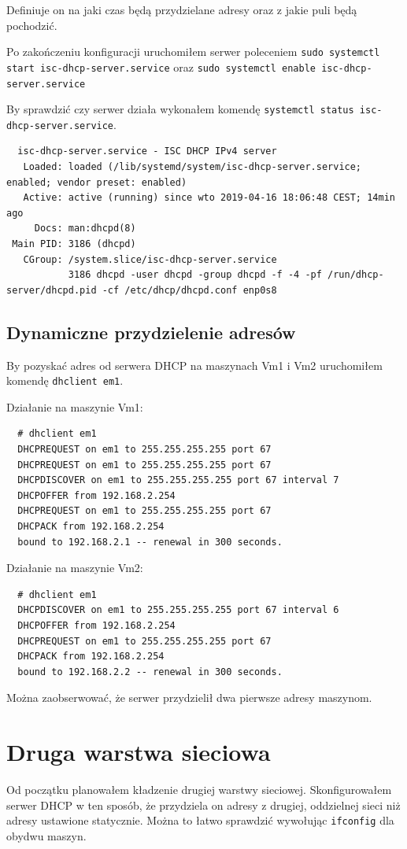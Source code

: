 \documentclass{mwart} %
\begin{document}
Definiuje on na jaki czas będą przydzielane adresy oraz z jakie puli będą pochodzić.

Po zakończeniu konfiguracji uruchomiłem serwer poleceniem \texttt{sudo systemctl start isc-dhcp-server.service} oraz \texttt{sudo systemctl enable isc-dhcp-server.service}

\vspace{3mm}
By sprawdzić czy serwer działa wykonałem komendę \texttt{systemctl status isc-dhcp-server.service}.
\begin{verbatim}
  isc-dhcp-server.service - ISC DHCP IPv4 server
   Loaded: loaded (/lib/systemd/system/isc-dhcp-server.service; enabled; vendor preset: enabled)
   Active: active (running) since wto 2019-04-16 18:06:48 CEST; 14min ago
     Docs: man:dhcpd(8)
 Main PID: 3186 (dhcpd)
   CGroup: /system.slice/isc-dhcp-server.service
           3186 dhcpd -user dhcpd -group dhcpd -f -4 -pf /run/dhcp-server/dhcpd.pid -cf /etc/dhcp/dhcpd.conf enp0s8
\end{verbatim}

\subsection{Dynamiczne przydzielenie adresów}
By pozyskać adres od serwera DHCP na maszynach Vm1 i Vm2 uruchomiłem komendę \texttt{dhclient em1}.

\vspace{2mm}
Działanie na maszynie Vm1:
\begin{verbatim}
  # dhclient em1
  DHCPREQUEST on em1 to 255.255.255.255 port 67
  DHCPREQUEST on em1 to 255.255.255.255 port 67
  DHCPDISCOVER on em1 to 255.255.255.255 port 67 interval 7
  DHCPOFFER from 192.168.2.254
  DHCPREQUEST on em1 to 255.255.255.255 port 67
  DHCPACK from 192.168.2.254
  bound to 192.168.2.1 -- renewal in 300 seconds.
\end{verbatim}

Działanie na maszynie Vm2:
\begin{verbatim}
  # dhclient em1
  DHCPDISCOVER on em1 to 255.255.255.255 port 67 interval 6
  DHCPOFFER from 192.168.2.254
  DHCPREQUEST on em1 to 255.255.255.255 port 67
  DHCPACK from 192.168.2.254
  bound to 192.168.2.2 -- renewal in 300 seconds.
\end{verbatim}

Można zaobserwować, że serwer przydzielił dwa pierwsze adresy maszynom.
 
\section{Druga warstwa sieciowa}
Od początku planowałem kładzenie drugiej warstwy sieciowej. Skonfigurowałem serwer DHCP w ten sposób, że przydziela on adresy z drugiej, oddzielnej sieci niż adresy ustawione statycznie. Można to łatwo sprawdzić wywołując \texttt{ifconfig} dla obydwu maszyn.
\end{document}
